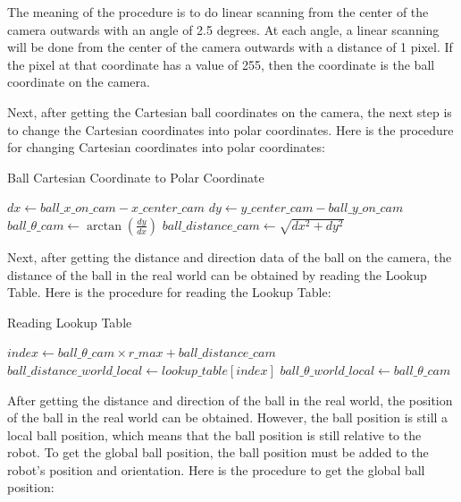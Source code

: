 The meaning of the procedure is to do linear scanning from the center of the camera outwards with an angle of 2.5 degrees. At each angle, a linear scanning will be done from the center of the camera outwards with a distance of 1 pixel. If the pixel at that coordinate has a value of 255, then the coordinate is the ball coordinate on the camera. 

Next, after getting the Cartesian ball coordinates on the camera, the next step is to change the Cartesian coordinates into polar coordinates. Here is the procedure for changing Cartesian coordinates into polar coordinates:

\begin{algorithm}[H]
  \caption{Ball Cartesian Coordinate to Polar Coordinate}\label{alg:prosedur4}
  \begin{algorithmic}[1]
      \State $dx \gets ball\_x\_on\_cam - x\_center\_cam$
      \State $dy \gets y\_center\_cam - ball\_y\_on\_cam$
      \State $ball\_\theta\_cam \gets \arctan(\frac{dy}{dx})$
      \State $ball\_distance\_cam \gets \sqrt{dx^2 + dy^2}$
  \EndProcedure
  \end{algorithmic}
\end{algorithm}

Next, after getting the distance and direction data of the ball on the camera, the distance of the ball in the real world can be obtained by reading the Lookup Table. Here is the procedure for reading the Lookup Table:

\begin{algorithm}[H]
  \caption{Reading Lookup Table}\label{alg:prosedur5}
  \begin{algorithmic}[1]
      \State $index \gets ball\_\theta\_cam \times r\_max + ball\_distance\_cam$
      \State $ball\_distance\_world\_local \gets lookup\_table[index]$
      \State $ball\_\theta\_world\_local \gets ball\_\theta\_cam$
  \EndProcedure
  \end{algorithmic}
\end{algorithm}


After getting the distance and direction of the ball in the real world, the position of the ball in the real world can be obtained. However, the ball position is still a local ball position, which means that the ball position is still relative to the robot. To get the global ball position, the ball position must be added to the robot's position and orientation. Here is the procedure to get the global ball position:

